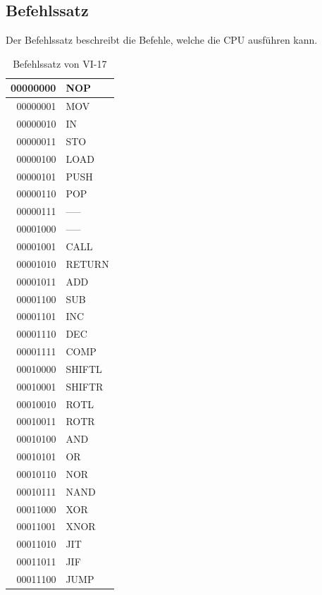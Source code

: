 \documentclass[12pt]{article}
\begin{document}
\subsection{Befehlssatz}

Der Befehlssatz beschreibt die Befehle, welche die CPU ausführen kann.
\newpage
\begin{table}[!htb]
\centering
\begin{tabular}{|r|l|}
  \hline
  00000000 & NOP \\
  \hline
  00000001 & MOV\\ 
  \hline
  00000010 & IN\\
  \hline
  00000011 & STO\\
  \hline
  00000100 & LOAD\\
  \hline
  00000101 & PUSH \\ 
  \hline
  00000110 & POP\\
  \hline
  00000111 & -----\\
 \hline
  00001000 & ----- \\
  \hline
  00001001 & CALL\\ 
  \hline
  00001010 & RETURN\\
  \hline
  00001011 & ADD\\
  \hline 
 00001100 & SUB \\
  \hline
  00001101 & INC\\ 
  \hline
  00001110 & DEC\\
  \hline
  00001111 & COMP\\
  \hline
  00010000 & SHIFTL\\
  \hline
  00010001 & SHIFTR\\ 
  \hline
  00010010 & ROTL\\
  \hline
  00010011 & ROTR\\
  \hline
  00010100 & AND\\
  \hline
  00010101 & OR \\ 
  \hline
  00010110 & NOR\\
  \hline
  00010111 & NAND\\
  \hline
  00011000 & XOR\\
  \hline
  00011001 & XNOR \\
  \hline
  00011010 & JIT\\
  \hline
  00011011 & JIF\\
  \hline
  00011100 & JUMP\\
  \hline
\end{tabular}
\caption{Befehlssatz von VI-17}
\end{table}
\newpage
\end{document}
